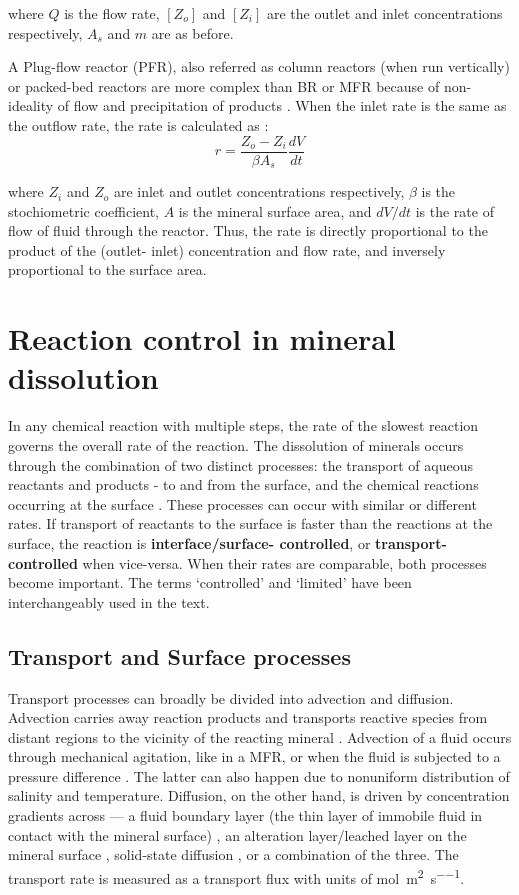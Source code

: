 where $Q$ is the flow rate, $[Z_o]$ and $[Z_i]$ are the outlet and inlet concentrations respectively, $A_s$ and $m$ are as before.

A Plug-flow reactor (PFR), also referred as column reactors (when run vertically) or packed-bed reactors are more complex than BR or MFR because of non-ideality of flow and precipitation of products \citep{Brantley2008a}. When the inlet rate is the same as the outflow rate, the rate is calculated as \citep{white2003}:
\begin{equation}\label{eq:back_flow}
r = \frac{Z_o - Z_i}{\beta A_s}\frac{dV}{dt}
\end{equation}

where $Z_i$ and $Z_o$ are inlet and outlet concentrations respectively, $\beta$ is the stochiometric coefficient, $A$ is the mineral surface area, and $dV/dt$ is the rate of flow of fluid through the reactor. Thus, the rate is directly proportional to the product of the (outlet- inlet) concentration and flow rate, and inversely proportional to the surface area. 

\section{Reaction control in mineral dissolution}\label{sec:section2}

In any chemical reaction with multiple steps, the rate of the slowest reaction governs the overall rate of the reaction. The dissolution of minerals occurs through the combination of two distinct processes: the transport of aqueous reactants and products - to and from the surface, and the chemical reactions occurring at the surface \citep{schott2009}. These processes can occur with similar or different rates. If transport of reactants to the surface is faster than the reactions at the surface, the reaction is \textbf{interface/surface- controlled}, or \textbf{transport-controlled} when vice-versa. When their rates are comparable, both processes become important. The terms `controlled' and `limited' have been interchangeably used in the text. 

\subsection{Transport and Surface processes}\label{subsec:transport}
Transport processes can broadly be divided into advection and diffusion. Advection carries away reaction products and transports reactive species from distant regions to the vicinity of the reacting mineral \citep{rimstidt2015}. Advection of a fluid occurs through mechanical agitation, like in a MFR, or when the fluid is subjected to a pressure difference \citep{rimstidt2013}. The latter can also happen due to nonuniform distribution of salinity and temperature. Diffusion, on the other hand, is driven by concentration gradients across --- a fluid boundary layer (the thin layer of immobile fluid in contact with the mineral surface) \citep{rimstidt2015}, an alteration layer/leached layer on the mineral surface \citep{luce1972,Brantley2008b}, solid-state diffusion \citep{luce1972}, or a combination of the three.
\noindent The transport rate is measured as a transport flux with units of \si{\mole\per\square\metre\per\second}.

